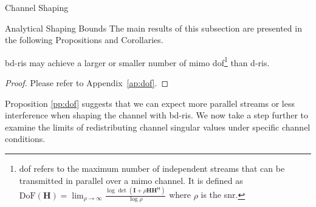 \documentclass[journal]{IEEEtran}
\begin{document}
\begin{section}{Channel Shaping}
	\begin{subsection}{Analytical Shaping Bounds}
		\label{sc:shaping_analytical}
		The main results of this subsection are presented in the following Propositions and Corollaries.
		\begin{proposition}
			\label{pp:dof}
			\gls{bd}-\gls{ris} may achieve a larger or smaller number of \gls{mimo} \gls{dof}\footnote{\gls{dof} refers to the maximum number of independent streams that can be transmitted in parallel over a \gls{mimo} channel. It is defined as $\mathrm{DoF}(\mathbf{H}) = \lim_{\rho \to \infty} \frac{\log \det(\mathbf{I} + \rho \mathbf{H} \mathbf{H}^\mathsf{H})}{\log \rho}$ where $\rho$ is the \gls{snr}.} than \gls{d}-\gls{ris}.
		\end{proposition}
		\begin{proof}
			Please refer to Appendix~\ref{ap:dof}.
		\end{proof}

		Proposition \ref{pp:dof} suggests that we can expect more parallel streams or less interference when shaping the channel with \gls{bd}-\gls{ris}.
		We now take a step further to examine the limits of redistributing channel singular values under specific channel conditions.


\end{subsection}
\end{section}
\end{document}
